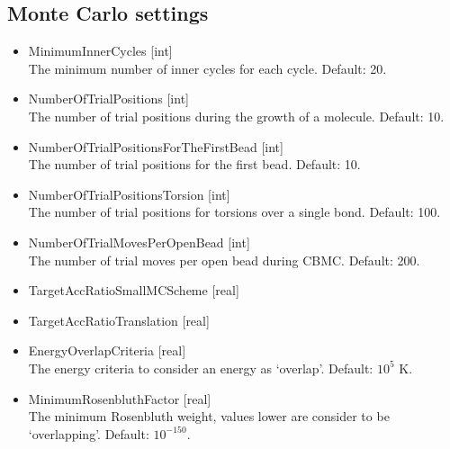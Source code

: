 \subsection*{Monte Carlo settings}
\begin{itemize}
\item{MinimumInnerCycles [int]}\\
The minimum number of inner cycles for each cycle. Default: 20.
\item{NumberOfTrialPositions [int]}\\
The number of trial positions during the growth of a molecule. Default: 10.
\item{NumberOfTrialPositionsForTheFirstBead [int]}\\
The number of trial positions for the first bead. Default: 10.
\item{NumberOfTrialPositionsTorsion [int]}\\
The number of trial positions for torsions over a single bond. Default: 100.
\item{NumberOfTrialMovesPerOpenBead [int]}\\
The number of trial moves per open bead during CBMC. Default: 200.
\item{TargetAccRatioSmallMCScheme [real]}\\
\item{TargetAccRatioTranslation [real]}\\
\item{EnergyOverlapCriteria [real]}\\
The energy criteria to consider an energy as `overlap'. Default: $10^5$ K.
\item{MinimumRosenbluthFactor [real]}\\
The minimum Rosenbluth weight, values lower are consider to be `overlapping'. Default: $10^{-150}$.
\end{itemize}

